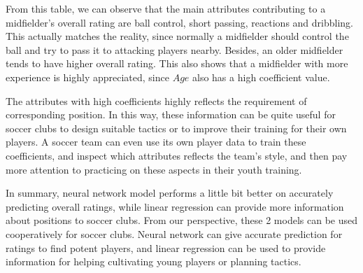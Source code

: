 \documentclass{article}
\begin{document}
From this table, we can observe that the main attributes contributing to a midfielder's overall rating are ball control, short passing, reactions and dribbling. This actually matches the reality, since normally a midfielder should control the ball and try to pass it to attacking players nearby. Besides, an older midfielder tends to have higher overall rating. This also shows that a midfielder with more experience is highly appreciated, since $Age$ also has a high coefficient value.

The attributes with high coefficients highly reflects the requirement of corresponding position. In this way, these information can be quite useful for soccer clubs to design suitable tactics or to improve their training for their own players. A soccer team can even use its own player data to train these coefficients, and inspect which attributes reflects the team's style, and then pay more attention to practicing on these aspects in their youth training.

In summary, neural network model performs a little bit better on accurately predicting overall ratings, while linear regression can provide more information about positions to soccer clubs. From our perspective, these 2 models can be used cooperatively for soccer clubs. Neural network can give accurate prediction for ratings to find potent players, and linear regression can be used to provide information for helping cultivating young players or planning tactics.

\nocite{*}


\end{document}
